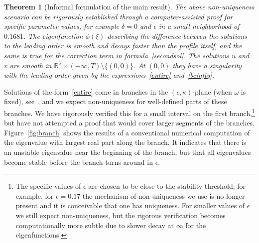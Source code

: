 \documentclass[11pt]{article}
\newtheorem{theorem}[definition]{Theorem}
\newcommand{\om}{\omega}
\newcommand{\RR}{\mathbb R}
\newcommand{\codenumber}[1]{#1}
\begin{document}
\begin{theorem}[Informal formulation of the main result]\label{thm-informal}
  The above non-uniqueness scenario can be rigorously established
  through a computer-assisted proof for specific parameter values, for
  example \(\delta=0\) and \(\epsilon\) in a small neighborhood of
  \(\codenumber{0.1681}\). The eigenfunction \(\phi(\xi)\) describing
  the difference between the solutions to the leading order is smooth
  and decays faster than the profile itself, and the same is true for
  the correction term in formula~\eqref{secondsol}. The solutions
  \(u\) and \(v\) are smooth in
  \(\RR^{3} \times (-\infty,T) \setminus \{(0,0)\}\). At \((0, 0)\)
  they have a singularity with the leading order given by the
  expressions~\eqref{entire} and~\eqref{bcinfty}.
\end{theorem}

Solutions of the form~\eqref{entire} come in branches in the
\((\epsilon,\kappa)\)-plane (when \(\om\) is fixed), see~\cite{Plech2001,
  Dahne2024}, and we expect non-uniqueness for well-defined parts
of these branches. We have rigorously verified this for a small
interval on the first branch,\footnote{The specific values of
  \(\epsilon\) are chosen to be close to the stability threshold; for
  example, for \(\epsilon=0.17\) the mechanism of non-uniqueness we use
  is no longer present and it is conceivable that one has
  uniqueness. For smaller values of \(\epsilon\) we still expect
  non-uniqueness, but the rigorous verification becomes
  computationally more subtle due to slower decay at \(\infty\) for the
  eigenfunctions.} but have not attempted a proof that would cover
larger segments of the branches. Figure~\ref{fig:branch} shows the
results of a conventional numerical computation of the eigenvalue with
largest real part along the branch. It indicates that there is an
unstable eigenvalue near the beginning of the branch, but that all
eigenvalues become stable before the branch turns around in
\(\epsilon\).
\end{document}
